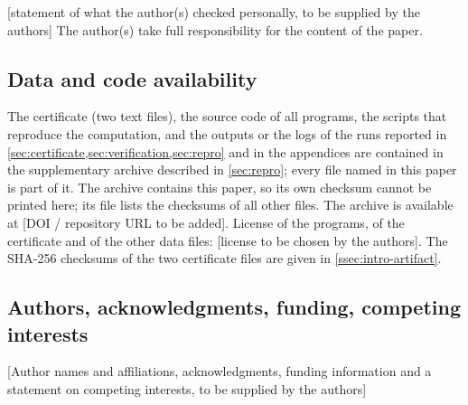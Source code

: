 [statement of what the author(s) checked personally, to be supplied by the authors]
The author(s) take full responsibility for the content of the paper.

\subsection*{Data and code availability}
The certificate (two text files), the source code of all programs, the scripts that reproduce the
computation, and the outputs or the logs of the runs reported in
\cref{sec:certificate,sec:verification,sec:repro} and in the appendices are contained in the
supplementary archive  described in \cref{sec:repro}; every file named in this
paper is part of it. The archive contains this paper, so its own checksum cannot be printed here; its
file  lists the checksums of all other files.
The archive is available at
[DOI / repository URL to be added].
License of the programs, of the certificate and of the other data files:
[license to be chosen by the authors].
The
SHA-256 checksums of the two certificate files are given in \cref{ssec:intro-artifact}.

\subsection*{Authors, acknowledgments, funding, competing interests}
[Author names and affiliations, acknowledgments, funding information and a statement on competing
interests, to be supplied by the authors]
